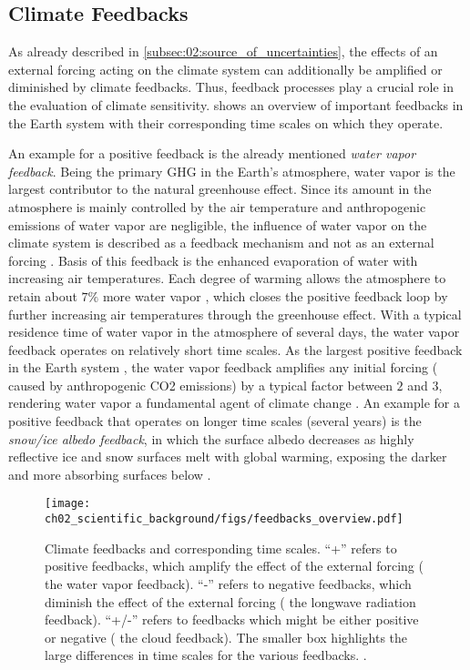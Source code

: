 \subsection{Climate Feedbacks}
\label{subsec:02:climate_feedbacks}

As already described in \cref{subsec:02:source_of_uncertainties}, the effects
of an external forcing acting on the climate system can additionally be
amplified or diminished by climate feedbacks. Thus, feedback processes play a
crucial role in the evaluation of climate sensitivity.
 shows an overview of important feedbacks in
the Earth system with their corresponding time scales on which they operate.

An example for a positive feedback is the already mentioned \emph{water vapor
  feedback}. Being the primary \ac{GHG} in the Earth's atmosphere, water vapor
is the largest contributor to the natural greenhouse effect. Since its amount
in the atmosphere is mainly controlled by the air temperature and anthropogenic
emissions of water vapor are negligible, the influence of water vapor on the
climate system is described as a feedback mechanism and not as an external
forcing \autocite{Myhre2013}. Basis of this feedback is the enhanced
evaporation of water with increasing air temperatures. Each degree of warming
allows the atmosphere to retain about $7 \unit{\%}$ more water vapor
\autocite{Myhre2013}, which closes the positive feedback loop by further
increasing air temperatures through the greenhouse effect. With a typical
residence time of water vapor in the atmosphere of several days, the water
vapor feedback operates on relatively short time scales. As the largest
positive feedback in the Earth system \autocite{Soden2006}, the water vapor
feedback amplifies any initial forcing (\eg{} caused by anthropogenic \ac{CO2}
emissions) by a typical factor between $2$ and $3$, rendering water vapor a
fundamental agent of climate change \autocite{Myhre2013}. An example for a
positive feedback that operates on longer time scales (several years) is the
\emph{snow/ice albedo feedback}, in which the surface albedo decreases as
highly reflective ice and snow surfaces melt with global warming, exposing the
darker and more absorbing surfaces below \autocite{Cubasch2013}.

\begin{figure}[!t]
  \centering
  \texttt{[image: 
    ch02\_scientific\_background/figs/feedbacks\_overview.pdf]}
  \caption{Climate feedbacks and corresponding time scales. \enquote{+} refers
    to positive feedbacks, which amplify the effect of the external forcing
    (\eg{} the water vapor feedback). \enquote{-} refers to negative feedbacks,
    which diminish the effect of the external forcing (\eg{} the longwave
    radiation feedback). \enquote{+/-} refers to feedbacks which might be
    either positive or negative (\eg{} the cloud feedback). The smaller box
    highlights the large differences in time scales for the various feedbacks.
    .}
  \label{fig:02:feedbacks_overview}
\end{figure}

